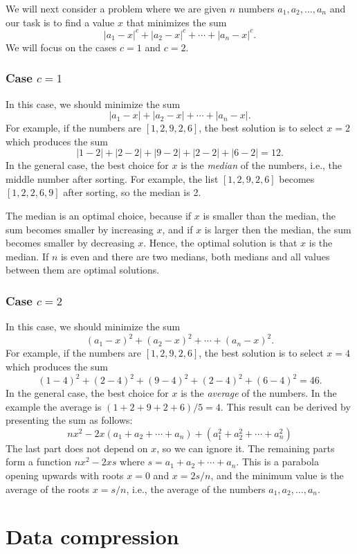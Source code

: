 We will next consider a problem where
we are given $n$ numbers $a_1,a_2,\ldots,a_n$
and our task is to find a value $x$
that minimizes the sum
\[|a_1-x|^c+|a_2-x|^c+\cdots+|a_n-x|^c.\]
We will focus on the cases $c=1$ and $c=2$.

\subsubsection{Case $c=1$}

In this case, we should minimize the sum
\[|a_1-x|+|a_2-x|+\cdots+|a_n-x|.\]
For example, if the numbers are $[1,2,9,2,6]$,
the best solution is to select $x=2$
which produces the sum
\[
|1-2|+|2-2|+|9-2|+|2-2|+|6-2|=12.
\]
In the general case, the best choice for $x$
is the \textit{median} of the numbers,
i.e., the middle number after sorting.
For example, the list $[1,2,9,2,6]$
becomes $[1,2,2,6,9]$ after sorting,
so the median is 2.

The median is an optimal choice,
because if $x$ is smaller than the median,
the sum becomes smaller by increasing $x$,
and if $x$ is larger then the median,
the sum becomes smaller by decreasing $x$.
Hence, the optimal solution is that $x$
is the median.
If $n$ is even and there are two medians,
both medians and all values between them
are optimal solutions.

\subsubsection{Case $c=2$}

In this case, we should minimize the sum
\[(a_1-x)^2+(a_2-x)^2+\cdots+(a_n-x)^2.\]
For example, if the numbers are $[1,2,9,2,6]$,
the best solution is to select $x=4$
which produces the sum
\[
(1-4)^2+(2-4)^2+(9-4)^2+(2-4)^2+(6-4)^2=46.
\]
In the general case, the best choice for $x$
is the \emph{average} of the numbers.
In the example the average is $(1+2+9+2+6)/5=4$.
This result can be derived by presenting
the sum as follows:
\[
nx^2 - 2x(a_1+a_2+\cdots+a_n) + (a_1^2+a_2^2+\cdots+a_n^2)
\]
The last part does not depend on $x$,
so we can ignore it.
The remaining parts form a function
$nx^2-2xs$ where $s=a_1+a_2+\cdots+a_n$.
This is a parabola opening upwards
with roots $x=0$ and $x=2s/n$,
and the minimum value is the average
of the roots $x=s/n$, i.e.,
the average of the numbers $a_1,a_2,\ldots,a_n$.

\section{Data compression}


